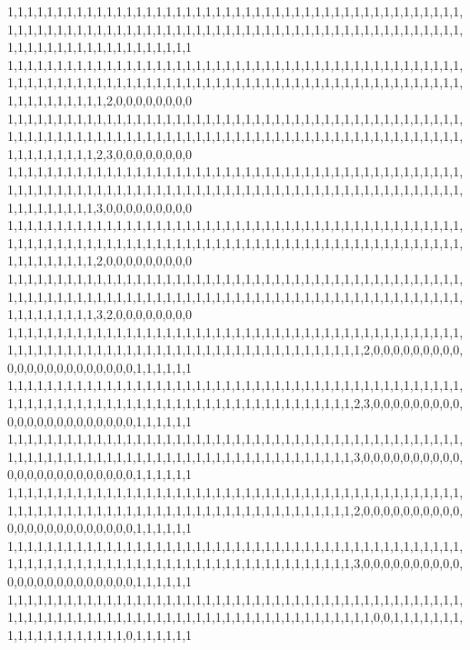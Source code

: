 1,1,1,1,1,1,1,1,1,1,1,1,1,1,1,1,1,1,1,1,1,1,1,1,1,1,1,1,1,1,1,1,1,1,1,1,1,1,1,1,1,1,1,1,1,1,1,1,1,1,1,1,1,1,1,1,1,1,1,1,1,1,1,1,1,1,1,1,1,1,1,1,1,1,1,1,1,1,1,1,1,1,1,1,1,1,1,1,1,1,1,1,1,1,1,1,1,1,1,1,1,1,1,1,1,1,1,1,1,1,1
1,1,1,1,1,1,1,1,1,1,1,1,1,1,1,1,1,1,1,1,1,1,1,1,1,1,1,1,1,1,1,1,1,1,1,1,1,1,1,1,1,1,1,1,1,1,1,1,1,1,1,1,1,1,1,1,1,1,1,1,1,1,1,1,1,1,1,1,1,1,1,1,1,1,1,1,1,1,1,1,1,1,1,1,1,1,1,1,1,1,1,1,1,1,1,1,1,1,1,1,1,1,2,0,0,0,0,0,0,0,0
1,1,1,1,1,1,1,1,1,1,1,1,1,1,1,1,1,1,1,1,1,1,1,1,1,1,1,1,1,1,1,1,1,1,1,1,1,1,1,1,1,1,1,1,1,1,1,1,1,1,1,1,1,1,1,1,1,1,1,1,1,1,1,1,1,1,1,1,1,1,1,1,1,1,1,1,1,1,1,1,1,1,1,1,1,1,1,1,1,1,1,1,1,1,1,1,1,1,1,1,1,2,3,0,0,0,0,0,0,0,0
1,1,1,1,1,1,1,1,1,1,1,1,1,1,1,1,1,1,1,1,1,1,1,1,1,1,1,1,1,1,1,1,1,1,1,1,1,1,1,1,1,1,1,1,1,1,1,1,1,1,1,1,1,1,1,1,1,1,1,1,1,1,1,1,1,1,1,1,1,1,1,1,1,1,1,1,1,1,1,1,1,1,1,1,1,1,1,1,1,1,1,1,1,1,1,1,1,1,1,1,1,3,0,0,0,0,0,0,0,0,0
1,1,1,1,1,1,1,1,1,1,1,1,1,1,1,1,1,1,1,1,1,1,1,1,1,1,1,1,1,1,1,1,1,1,1,1,1,1,1,1,1,1,1,1,1,1,1,1,1,1,1,1,1,1,1,1,1,1,1,1,1,1,1,1,1,1,1,1,1,1,1,1,1,1,1,1,1,1,1,1,1,1,1,1,1,1,1,1,1,1,1,1,1,1,1,1,1,1,1,1,1,2,0,0,0,0,0,0,0,0,0
1,1,1,1,1,1,1,1,1,1,1,1,1,1,1,1,1,1,1,1,1,1,1,1,1,1,1,1,1,1,1,1,1,1,1,1,1,1,1,1,1,1,1,1,1,1,1,1,1,1,1,1,1,1,1,1,1,1,1,1,1,1,1,1,1,1,1,1,1,1,1,1,1,1,1,1,1,1,1,1,1,1,1,1,1,1,1,1,1,1,1,1,1,1,1,1,1,1,1,1,1,3,2,0,0,0,0,0,0,0,0
1,1,1,1,1,1,1,1,1,1,1,1,1,1,1,1,1,1,1,1,1,1,1,1,1,1,1,1,1,1,1,1,1,1,1,1,1,1,1,1,1,1,1,1,1,1,1,1,1,1,1,1,1,1,1,1,1,1,1,1,1,1,1,1,1,1,1,1,1,1,1,1,1,1,1,1,1,1,1,1,1,1,2,0,0,0,0,0,0,0,0,0,0,0,0,0,0,0,0,0,0,0,0,0,0,1,1,1,1,1,1
1,1,1,1,1,1,1,1,1,1,1,1,1,1,1,1,1,1,1,1,1,1,1,1,1,1,1,1,1,1,1,1,1,1,1,1,1,1,1,1,1,1,1,1,1,1,1,1,1,1,1,1,1,1,1,1,1,1,1,1,1,1,1,1,1,1,1,1,1,1,1,1,1,1,1,1,1,1,1,1,1,2,3,0,0,0,0,0,0,0,0,0,0,0,0,0,0,0,0,0,0,0,0,0,0,1,1,1,1,1,1
1,1,1,1,1,1,1,1,1,1,1,1,1,1,1,1,1,1,1,1,1,1,1,1,1,1,1,1,1,1,1,1,1,1,1,1,1,1,1,1,1,1,1,1,1,1,1,1,1,1,1,1,1,1,1,1,1,1,1,1,1,1,1,1,1,1,1,1,1,1,1,1,1,1,1,1,1,1,1,1,1,3,0,0,0,0,0,0,0,0,0,0,0,0,0,0,0,0,0,0,0,0,0,0,0,1,1,1,1,1,1
1,1,1,1,1,1,1,1,1,1,1,1,1,1,1,1,1,1,1,1,1,1,1,1,1,1,1,1,1,1,1,1,1,1,1,1,1,1,1,1,1,1,1,1,1,1,1,1,1,1,1,1,1,1,1,1,1,1,1,1,1,1,1,1,1,1,1,1,1,1,1,1,1,1,1,1,1,1,1,1,1,2,0,0,0,0,0,0,0,0,0,0,0,0,0,0,0,0,0,0,0,0,0,0,0,1,1,1,1,1,1
1,1,1,1,1,1,1,1,1,1,1,1,1,1,1,1,1,1,1,1,1,1,1,1,1,1,1,1,1,1,1,1,1,1,1,1,1,1,1,1,1,1,1,1,1,1,1,1,1,1,1,1,1,1,1,1,1,1,1,1,1,1,1,1,1,1,1,1,1,1,1,1,1,1,1,1,1,1,1,1,1,3,0,0,0,0,0,0,0,0,0,0,0,0,0,0,0,0,0,0,0,0,0,0,0,1,1,1,1,1,1
1,1,1,1,1,1,1,1,1,1,1,1,1,1,1,1,1,1,1,1,1,1,1,1,1,1,1,1,1,1,1,1,1,1,1,1,1,1,1,1,1,1,1,1,1,1,1,1,1,1,1,1,1,1,1,1,1,1,1,1,1,1,1,1,1,1,1,1,1,1,1,1,1,1,1,1,1,1,1,1,1,1,1,0,0,1,1,1,1,1,1,1,1,1,1,1,1,1,1,1,1,1,1,1,0,1,1,1,1,1,1
